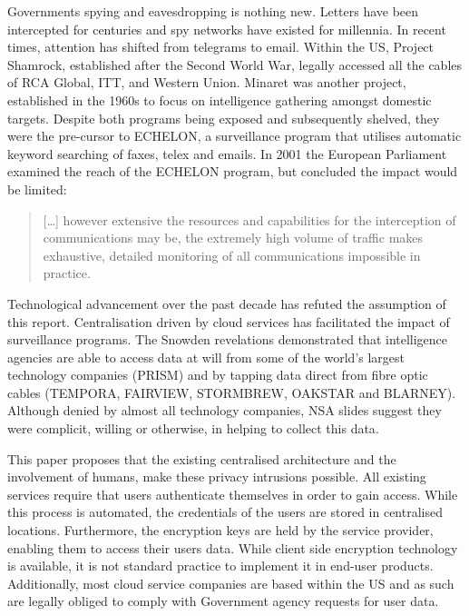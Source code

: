 \documentclass[twocolumn,english]{article}
\begin{document}
Governments spying and eavesdropping is nothing new\cite{bbc13}. Letters have been intercepted for centuries and spy networks have existed for millennia. In recent times, attention has shifted from
telegrams to email. Within the US, Project Shamrock, established after
the Second World War, legally accessed all the cables of RCA Global,
ITT, and Western Union. Minaret was another project, established in
the 1960s to focus on intelligence gathering amongst domestic targets. Despite both programs being exposed and subsequently shelved, they
were the pre-cursor to ECHELON, a surveillance program that utilises automatic
keyword searching of faxes, telex and emails.  In 2001 the European Parliament examined the reach of the ECHELON program, but concluded the impact would be limited\cite{Schmid01}: 
\begin{quote}
[\dots] however extensive the resources and capabilities for the interception of communications may be, the extremely high volume of traffic makes exhaustive, detailed monitoring of all communications impossible in practice.
\end{quote}
 
Technological advancement over the past decade has refuted the assumption of this report.  Centralisation driven by cloud services has facilitated the impact of surveillance programs. The Snowden revelations demonstrated that
intelligence agencies are able to access data at will from some of
the world\textquoteright s largest technology companies (PRISM) and
by tapping data direct from fibre optic cables (TEMPORA, FAIRVIEW,
STORMBREW, OAKSTAR and BLARNEY)\cite{guardianNSA}. Although denied by almost all technology companies, NSA slides suggest
they were complicit, willing or otherwise, in helping to collect this
data\cite{guardian13}.

This paper proposes that the existing centralised architecture and the involvement of humans, make these privacy
intrusions possible. All existing services require that users authenticate themselves in order to gain access.  While this process is automated, the credentials
of the users are stored in centralised locations. Furthermore, the
encryption keys are held by the service provider, enabling them to
access their users data\cite{lambert12}. While client side encryption technology is available, it is not standard practice to implement it in end-user products. Additionally, most cloud service companies are based within the US and as such are legally obliged to comply with Government agency
requests for user data.
\end{document}
